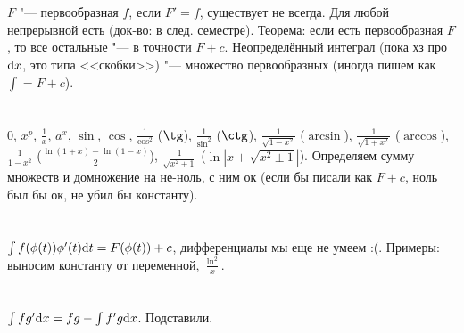\setcounter{section}{88}
\section{} %
$F$ "--- первообразная $f$, если $F'=f$, существует не всегда. Для любой непрерывной есть (док-во: в след.
семестре). Теорема: если есть первообразная $F$, то все остальные "--- в точности $F+c$.
Неопределённый интеграл (пока хз про $\mathrm{d} x$, это типа <<скобки>>) "--- множество первообразных
(иногда пишем как $\int = F + c$).

\section{} %
0, $x^p$, $\frac 1x$, $a^x$, $\sin$, $\cos$, $\frac 1{\cos^2}$ ($\tg$), $\frac 1{\sin^2}$ ($\ctg$),
$\frac{1}{\sqrt{1-x^2}}$ ($\arcsin$), $\frac{1}{\sqrt{1+x^2}}$ ($\arccos$), $\frac{1}{1-x^2}$ ($\frac{\ln(1+x)-\ln(1-x)}{2}$),
$\frac{1}{\sqrt{x^2\pm1}}$ ($\ln |x+\sqrt{x^2\pm1}|$).
Определяем сумму множеств и домножение на не-ноль, с ним ок (если бы писали как $F+c$, ноль был бы ок,
не убил бы константу).

\section{} %
$\int f(\phi(t)) \phi'(t) \mathrm{d} t = F(\phi(t)) + c$, дифференциалы мы еще не умеем :(. Примеры:
выносим константу от переменной, $\frac{\ln^2}{x}$.

\section{} %
$\int fg' \mathrm{d} x = fg - \int f'g \mathrm{d} x$. Подставили.
